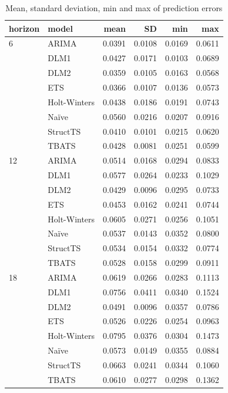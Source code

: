 \documentclass[]{article}
\begin{document}
\begin{table}[t]

\caption{\label{tab:mape-table}Mean, standard deviation, min and max of prediction errors}
\centering
\begin{tabular}{llrrrr}
\toprule
horizon & model & mean & SD & min & max\\
\midrule
6 & ARIMA & 0.0391 & 0.0108 & 0.0169 & 0.0611\\
 & DLM1 & 0.0427 & 0.0171 & 0.0103 & 0.0689\\
 & DLM2 & 0.0359 & 0.0105 & 0.0163 & 0.0568\\
 & ETS & 0.0366 & 0.0107 & 0.0136 & 0.0573\\
 & Holt-Winters & 0.0438 & 0.0186 & 0.0191 & 0.0743\\
\addlinespace
 & Naïve & 0.0560 & 0.0216 & 0.0207 & 0.0916\\
 & StructTS & 0.0410 & 0.0101 & 0.0215 & 0.0620\\
 & TBATS & 0.0428 & 0.0081 & 0.0251 & 0.0599\\
12 & ARIMA & 0.0514 & 0.0168 & 0.0294 & 0.0833\\
 & DLM1 & 0.0577 & 0.0264 & 0.0233 & 0.1029\\
\addlinespace
 & DLM2 & 0.0429 & 0.0096 & 0.0295 & 0.0733\\
 & ETS & 0.0453 & 0.0162 & 0.0241 & 0.0744\\
 & Holt-Winters & 0.0605 & 0.0271 & 0.0256 & 0.1051\\
 & Naïve & 0.0537 & 0.0143 & 0.0352 & 0.0800\\
 & StructTS & 0.0534 & 0.0154 & 0.0332 & 0.0774\\
\addlinespace
 & TBATS & 0.0528 & 0.0158 & 0.0299 & 0.0911\\
18 & ARIMA & 0.0619 & 0.0266 & 0.0283 & 0.1113\\
 & DLM1 & 0.0756 & 0.0411 & 0.0340 & 0.1524\\
 & DLM2 & 0.0491 & 0.0096 & 0.0357 & 0.0786\\
 & ETS & 0.0526 & 0.0226 & 0.0254 & 0.0963\\
\addlinespace
 & Holt-Winters & 0.0795 & 0.0376 & 0.0304 & 0.1473\\
 & Naïve & 0.0573 & 0.0149 & 0.0355 & 0.0884\\
 & StructTS & 0.0663 & 0.0241 & 0.0344 & 0.1060\\
 & TBATS & 0.0610 & 0.0277 & 0.0298 & 0.1362\\
\bottomrule
\end{tabular}
\end{table}
\end{document}

